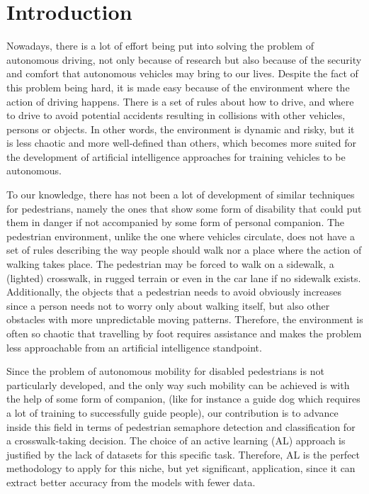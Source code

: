 \documentclass[journal, a4paper]{IEEEtran}
\begin{document}
\section{Introduction}

Nowadays, there is a lot of effort being put into solving the problem of 
autonomous driving, not only because of research but also because of the security 
and comfort that autonomous vehicles may bring to our lives. Despite the fact of 
this problem being hard, it is made easy because of the environment
where the action of driving happens. There is a set of rules about how to drive, 
and where to drive to avoid potential accidents resulting in collisions with 
other vehicles, persons or objects. In other words, the environment is dynamic 
and risky, but it is less chaotic and more well-defined than others, which becomes 
more suited for the development of artificial intelligence approaches for training 
vehicles to be autonomous. 

To our knowledge, there has not been a lot of development of similar techniques 
for pedestrians, namely the ones that show some form of disability that could put 
them in danger if not accompanied by some form of personal companion. The 
pedestrian environment, unlike the one where vehicles circulate, does not have a 
set of rules describing the way people should walk nor a place where the action of 
walking takes place. The pedestrian may be forced to walk on a sidewalk, a 
(lighted) crosswalk, in rugged terrain or even in the car lane if no sidewalk 
exists. Additionally, the objects that a pedestrian needs to avoid obviously 
increases since a person needs not to worry only about walking itself, but also 
other obstacles with more unpredictable moving patterns. Therefore, the 
environment is often so chaotic that travelling by foot requires assistance and 
makes the problem less approachable from an artificial intelligence standpoint.

Since the problem of autonomous mobility for disabled pedestrians is not 
particularly developed, and the only way such mobility can be achieved is with 
the help of some form of companion, (like for instance a guide dog which requires 
a lot of training to successfully guide people), our contribution is to advance 
inside this field in terms of pedestrian semaphore detection and classification 
for a crosswalk-taking decision. The choice of an active learning (AL) approach 
is justified by the lack of datasets for this specific task. Therefore, AL is the 
perfect methodology to apply for this niche, but yet significant, application, 
since it can extract better accuracy from the models with fewer data.
\end{document}
